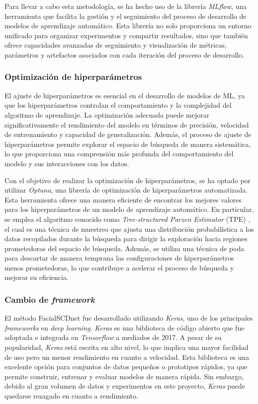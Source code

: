 Para llevar a cabo esta metodología, se ha hecho uso de la librería \textit{MLflow}, una herramienta que facilita la gestión y el seguimiento del proceso de desarrollo de modelos de aprendizaje automático. Esta librería no solo proporciona un entorno unificado para organizar experimentos y compartir resultados, sino que también ofrece capacidades avanzadas de seguimiento y visualización de métricas, parámetros y artefactos asociados con cada iteración del proceso de desarrollo.

\subsubsection{Optimización de hiperparámetros}

El ajuste de hiperparámetros es esencial en el desarrollo de modelos de ML, ya que los hiperparámetros controlan el comportamiento y la complejidad del algoritmo de aprendizaje. La optimización adecuada puede mejorar significativamente el rendimiento del modelo en términos de precisión, velocidad de entrenamiento y capacidad de generalización. Además, el proceso de ajuste de hiperparámetros permite explorar el espacio de búsqueda de manera sistemática, lo que proporciona una comprensión más profunda del comportamiento del modelo y sus interacciones con los datos.

Con el objetivo de realizar la optimización de hiperparámetros, se ha optado por utilizar \textit{Optuna}, una librería de optimización de hiperparámetros automatizada. Esta herramienta ofrece una manera eficiente de encontrar los mejores valores para los hiperparámetros de un modelo de aprendizaje automático. En particular, se emplea el algoritmo conocido como \textit{Tree-structured Parzen Estimator} (TPE) \cite{71}, el cual es una técnica de muestreo que ajusta una distribución probabilística a los datos recopilados durante la búsqueda para dirigir la exploración hacia regiones prometedoras del espacio de búsqueda. Además, se utiliza una técnica de poda para descartar de manera temprana las configuraciones de hiperparámetros menos prometedoras, lo que contribuye a acelerar el proceso de búsqueda y mejorar su eficiencia.


\subsubsection{Cambio de \textit{framework}}

El método FacialSCDnet fue desarrollado utilizando \textit{Keras}, uno de los principales \textit{frameworks} en \textit{deep learning}. \textit{Keras} es una biblioteca de código abierto que fue adoptada e integrada en \textit{Tensorflow} a mediados de 2017. A pesar de su popularidad, \textit{Keras} está escrita en alto nivel, lo que implica una mayor facilidad de uso pero un menor rendimiento en cuanto a velocidad. Esta biblioteca es una excelente opción para conjuntos de datos pequeños o prototipos rápidos, ya que permite construir, entrenar y evaluar modelos de manera rápida. Sin embargo, debido al gran volumen de datos y experimentos en este proyecto, \textit{Keras} puede quedarse rezagado en cuanto a rendimiento.

